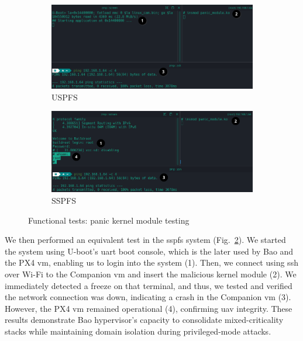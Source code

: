 \begin{figure}[!hbt]
  \centering
  \begin{subfigure}[t]{0.8\textwidth}
    \centering
    \includegraphics[width=1.0\textwidth]{./img/png/kmod-panic-test-annot} 
    \caption{USPFS}%
    \label{fig:kmod-panic-test-uspfs}
  \end{subfigure}
  \begin{subfigure}[t]{0.8\textwidth}
    \centering
    \includegraphics[width=\linewidth]{./img/png/kmod-panic-test-bao-annot} %
    \caption{SSPFS}%
    \label{fig:kmod-panic-test-sspfs}
  \end{subfigure}
  \caption{Functional tests: panic kernel module testing}
  \label{fig:kmod-panic-test}
\end{figure}


We then performed an equivalent test in the \gls{sspfs} system (Fig.~\ref{fig:kmod-panic-test-sspfs}). We started the
system using U-boot's \gls{uart} boot console, which is the later used by Bao
and the PX4 \gls{vm}, enabling us to login into the system (1). Then, we connect
using \gls{ssh} over Wi-Fi to the Companion \gls{vm} and insert the malicious
kernel module (2). We immediately detected a freeze on that terminal, and thus,
we tested and verified the network connection was down, indicating a crash in
the Companion \gls{vm} (3). However, the PX4 \gls{vm} remained operational (4),
confirming \gls{uav} integrity.
%
These results demonstrate Bao hypervisor's capacity to consolidate
mixed-criticality stacks while maintaining domain isolation during
privileged-mode attacks.

